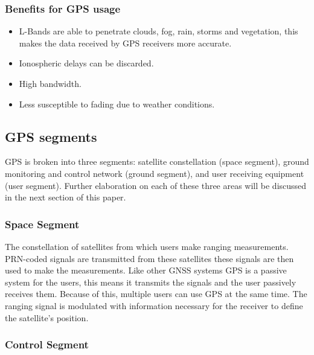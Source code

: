 \documentclass[conference]{IEEEtran}
\begin{document}
\subsubsection{Benefits for GPS usage}

\begin{itemize}
    \item L-Bands are able to penetrate clouds, fog, rain, storms and vegetation, this makes the data received by GPS receivers more accurate.
    
    \item Ionospheric delays can be discarded.
    
    \item High bandwidth.
    
    \item Less susceptible to fading due to weather conditions. 
    
\end{itemize}

\subsection{GPS segments}

GPS is broken into three segments: satellite constellation (space segment), ground monitoring and control network (ground segment), and user receiving equipment (user segment). Further elaboration on each of these three areas will be discussed in the next section of this paper.

\subsubsection{\textbf{Space Segment}}

The constellation of satellites from which users make ranging measurements. PRN-coded signals are transmitted from these satellites these signals are then used to make the measurements. Like other GNSS systems GPS is a passive system for the users, this means it transmits the signals and the user passively receives them. Because of this, multiple users can use GPS at the same time. The ranging signal is modulated with information necessary for the receiver to define the satellite's position.

\subsubsection{\textbf{Control Segment}}
\end{document}
